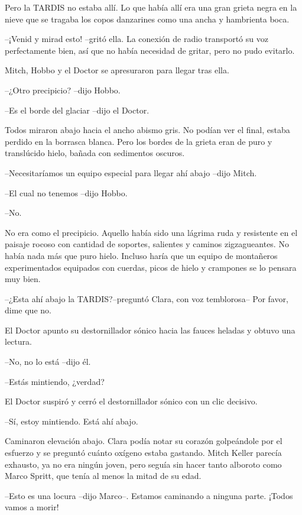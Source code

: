 {Pero la TARDIS no estaba allí. Lo que había allí era una gran grieta
 negra en la nieve que se tragaba los copos danzarines como una ancha y
hambrienta boca.}

{--¡Venid y mirad esto! --gritó ella. La conexión de radio transportó su
 voz perfectamente bien, así que no había necesidad de gritar, pero no
pudo evitarlo.}

{Mitch, Hobbo y el Doctor se apresuraron para llegar tras ella.}

{--¿Otro precipicio? --dijo Hobbo.}

{--Es el borde del glaciar --dijo el Doctor.}

{Todos miraron abajo hacia el ancho abismo gris. No podían ver el final,
 estaba perdido en la borrasca blanca. Pero los bordes de la grieta eran
de puro y translúcido hielo, bañada con sedimentos oscuros.}

{--Necesitaríamos un equipo especial para llegar ahí abajo --dijo
Mitch.}

{--El cual no tenemos --dijo Hobbo.}

{--No.}

{No era como el precipicio. Aquello había sido una lágrima ruda y
 resistente en el paisaje rocoso con cantidad de soportes, salientes y
 caminos zigzagueantes. No había nada más que puro hielo. Incluso haría
 que un equipo de montañeros experimentados equipados con cuerdas, picos
de hielo y crampones se lo pensara muy bien.}

{--¿Esta ahí abajo la TARDIS?\@ --preguntó Clara, con voz temblorosa-- Por
favor, dime que no.}

{El Doctor apunto su destornillador sónico hacia las fauces heladas y
obtuvo una lectura.}

{--No, no lo está --dijo él.}

{--Estás mintiendo, ¿verdad?}

{El Doctor suspiró y cerró el destornillador sónico con un clic
decisivo.}

{--Sí, estoy mintiendo. Está ahí abajo.}

{Caminaron
 elevación abajo. Clara podía notar su corazón golpeándole por el
 esfuerzo y se preguntó cuánto oxígeno estaba gastando. Mitch Keller
 parecía exhausto, ya no era ningún joven, pero seguía sin hacer tanto
alboroto como Marco Spritt, que tenía al menos la mitad de su edad.}

{--Esto es una locura --dijo Marco--. Estamos caminando a ninguna parte.
¡Todos vamos a morir!}

